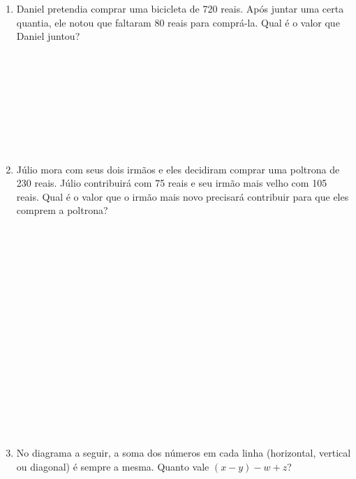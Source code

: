 \documentclass[a4paper,14pt]{article}
\begin{document}
\begin{multicols}{2}
\begin{enumerate}
\begin{enumerate}[a)]
    		\end{enumerate}
    		\item Daniel pretendia comprar uma bicicleta de 720 reais. Após juntar uma certa quantia, ele notou que faltaram 80 reais para comprá-la. Qual é o valor que Daniel juntou? \\\\\\\\\\\\\\\\\\
    		\item Júlio mora com seus dois irmãos e eles decidiram comprar uma poltrona de 230 reais. Júlio contribuirá com 75 reais e seu irmão mais velho com 105 reais. Qual é o valor que o irmão mais novo precisará contribuir para que eles comprem a poltrona? \\\\\\\\\\\\\\\\\\\\\\\\\\\\\\\\\\
    		\item No diagrama a seguir, a soma dos números em cada linha (horizontal, vertical ou diagonal) é sempre a mesma. Quanto vale $(x - y) - w + z$?

\end{enumerate}
\end{multicols}
\end{document}
